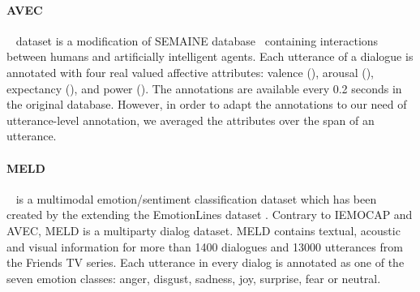 \documentclass[11pt,a4paper]{article}
\begin{document}
\paragraph{AVEC}~\cite{Schuller:2012:ACA:2388676.2388776} dataset is a modification of
SEMAINE database~\cite{5959155} containing interactions between humans and
artificially intelligent agents. 
Each utterance of a dialogue is annotated with four real valued affective attributes: valence (), arousal (), expectancy (), and power (). 
The annotations are available every 0.2 seconds in the original database. 
However, in order to adapt the annotations to our need of utterance-level annotation, we averaged the attributes over the span of an utterance.

\paragraph{MELD}~\cite{poria2018meld} is a multimodal emotion/sentiment classification dataset which has been created by the extending the EmotionLines dataset \cite{chen2018emotionlines}.
Contrary to IEMOCAP and AVEC, MELD is a multiparty dialog dataset.
MELD contains textual, acoustic and visual information for more than 1400 dialogues and 13000 utterances from the Friends TV series.
Each utterance in every dialog is annotated as one of the seven emotion classes: anger, disgust, sadness, joy, surprise, fear or neutral.

\begin{table}[ht!]
\centering
{}
    \caption{Training, validation and test data distribution in the datasets. No predefined train/val split is provided in IEMOCAP and AVEC, hence we use 10\% of the training dialogues as validation split.}
        \label{table:data1}
\end{table}
\end{document}
